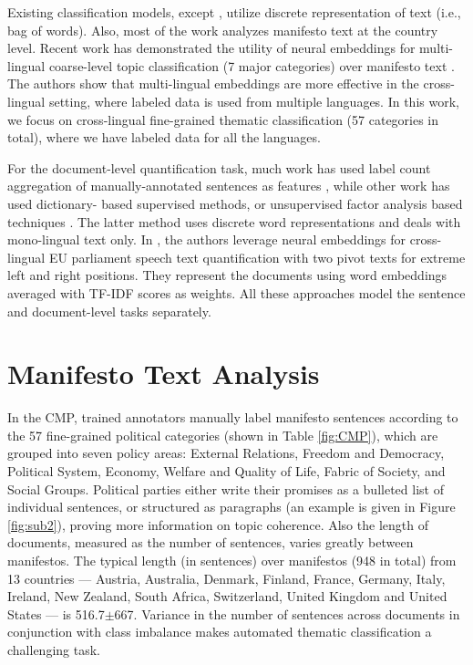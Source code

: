 \documentclass[11pt,a4paper]{article}
\begin{document}
Existing classification models, except \cite{W17-2906}, utilize discrete representation of text (i.e., bag of words).  Also, most of the work analyzes manifesto text at the country level. Recent work has demonstrated the utility of neural embeddings for multi-lingual coarse-level topic classification (7 major categories) over manifesto text \cite{W17-2906}. The authors show that multi-lingual embeddings are more effective in the cross-lingual setting, where labeled data is used from multiple languages. In this work, we focus on cross-lingual fine-grained thematic classification (57 categories in total), where we have labeled data for all the languages.

For the document-level quantification task, much work has used label count aggregation of  manually-annotated sentences as features \cite{lowe2011scaling, benoit2014putting}, while other work has used dictionary- based supervised methods, or unsupervised factor analysis based techniques \cite{hjorth2015computers, 2017arXiv170704737B}. The latter method uses discrete word representations and deals with mono-lingual text only. In , the authors leverage neural embeddings for cross-lingual EU parliament speech text quantification with two pivot texts for extreme left and right positions. They represent the documents using word embeddings averaged with TF-IDF scores as weights. All these approaches model the sentence and document-level tasks separately.


\section{Manifesto Text Analysis}

In the CMP, trained annotators manually label manifesto sentences according to the 57 fine-grained political categories (shown in Table \ref{fig:CMP}), which are grouped into seven policy areas: External Relations, Freedom and Democracy, Political System, Economy, Welfare and Quality of Life, Fabric of Society, and Social Groups. Political parties either write their promises as a bulleted list of individual sentences, or structured as paragraphs (an example is given in Figure \ref{fig:sub2}), proving more information on topic coherence. Also the length of documents, measured as the number of sentences, varies greatly between manifestos. The typical length (in sentences) over manifestos (948 in total) from 13 countries --- Austria, Australia, Denmark, Finland, France, Germany, Italy, Ireland, New Zealand, South Africa, Switzerland, United Kingdom and United States --- is 516.7$\pm$667. Variance in the number of sentences across documents in conjunction with class imbalance makes automated thematic classification a challenging task.  
\end{document}
